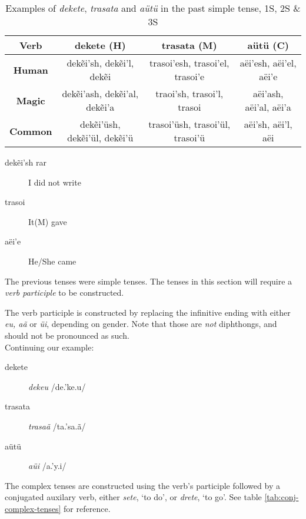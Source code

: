 \begin{table}[h]
\begin{center}
\begin{tabular}{|c|c|c|c|}\hline

\textbf{Verb}   & dekete (H) & trasata (M) & aütü (C) \\\hline
\textbf{Human}  & dekẽi’sh, dekẽi’l, dekẽi & trasoi’esh, trasoi’el, trasoi’e & aëi’esh, aëi’el, aëi’e \\\hline
\textbf{Magic}  & dekẽi’ash, dekẽi’al, dekẽi’a & traoi’sh, trasoi’l, trasoi & aëi’ash, aëi’al, aëi’a \\\hline
\textbf{Common} & dekẽi’üsh, dekẽi’ül, dekẽi’ü & trasoi’üsh, trasoi’ül, trasoi’ü & aëi’sh, aëi’l, aëi \\\hline

\end{tabular}
\end{center}
\caption{Examples of \emph{dekete}, \emph{trasata} and \emph{aütü} in the past simple tense, 1S, 2S \& 3S}
\label{tab:conj-past-simple}
\end{table}

\begin{description}
\item[dekẽi’sh rar] I did not write
\item[trasoi] It(M) gave
\item[aëi’e] He/She came
\end{description}

The previous tenses were simple tenses. The tenses in this section will require a \emph{verb participle} to be constructed.

The verb participle is constructed by replacing the infinitive ending with either \emph{eu, aã} or \emph{üi}, depending on gender. Note that those are \emph{not} diphthongs, and should not be pronounced as such.\\

Continuing our example:
\begin{description}
\item[dekete] \emph{dekeu} /de.'ke.u/
\item[trasata] \emph{trasaã} /t{\ipaR}a.'sa.ã/
\item[aütü] \emph{aüi} /a.'y.i/
\end{description}

The complex tenses are constructed using the verb’s participle followed by a conjugated auxilary verb, either \emph{sete}, ‘to do’, or \emph{drete}, ‘to go’.
See table \ref{tab:conj-complex-tenses} for reference.

